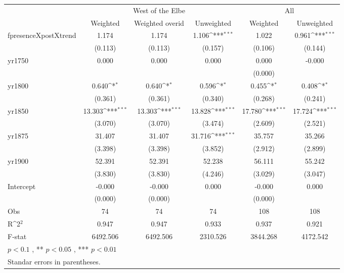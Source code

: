{
\def\sym#1{\ifmmode^{#1}\else\(^{#1}\)\fi}
\begin{tabular}{@{\extracolsep{2pt}}l*{5}{c}@{}}
\hline\hline
& \multicolumn{3}{c}{West of the Elbe} & \multicolumn{2}{c}{All} \\
\cline{2-4}
\cline{5-6}
 & Weighted & Weighted overid & Unweighted & Weighted & Unweighted \\
\hline
fpresenceXpostXtrend & 1.174 & 1.174 & 1.106\sym{***} & 1.022 & 0.961\sym{***} \\
 & (0.113) & (0.113) & (0.157) & (0.106) & (0.144) \\
yr1750 & 0.000 & 0.000 & 0.000 & 0.000 & -0.000 \\
 &  &  &  & (0.000) &  \\
yr1800 & 0.640\sym{*} & 0.640\sym{*} & 0.596\sym{*} & 0.455\sym{*} & 0.408\sym{*} \\
 & (0.361) & (0.361) & (0.340) & (0.268) & (0.241) \\
yr1850 & 13.303\sym{***} & 13.303\sym{***} & 13.828\sym{***} & 17.780\sym{***} & 17.724\sym{***} \\
 & (3.070) & (3.070) & (3.474) & (2.609) & (2.521) \\
yr1875 & 31.407 & 31.407 & 31.716\sym{***} & 35.757 & 35.266 \\
 & (3.398) & (3.398) & (3.852) & (2.912) & (2.899) \\
yr1900 & 52.391 & 52.391 & 52.238 & 56.111 & 55.242 \\
 & (3.830) & (3.830) & (4.246) & (3.029) & (3.047) \\
Intercept & -0.000 & -0.000 & 0.000 & -0.000 & 0.000 \\
 & (0.000) & (0.000) &  & (0.000) &  \\

\hline
Obs & 74 & 74 & 74 & 108 & 108 \\
R\sym{2} & 0.947 & 0.947 & 0.933 & 0.937 & 0.921 \\
F-stat & 6492.506 & 6492.506 & 2310.526 & 3844.268 & 4172.542 \\
\hline\hline
\multicolumn{6}{l}{\footnotesize *$p < 0.1$ , ** $p < 0.05$ , *** $p < 0.01$} \\
\multicolumn{6}{l}{\footnotesize Standar errors in parentheses.} \\
\end{tabular}
}
